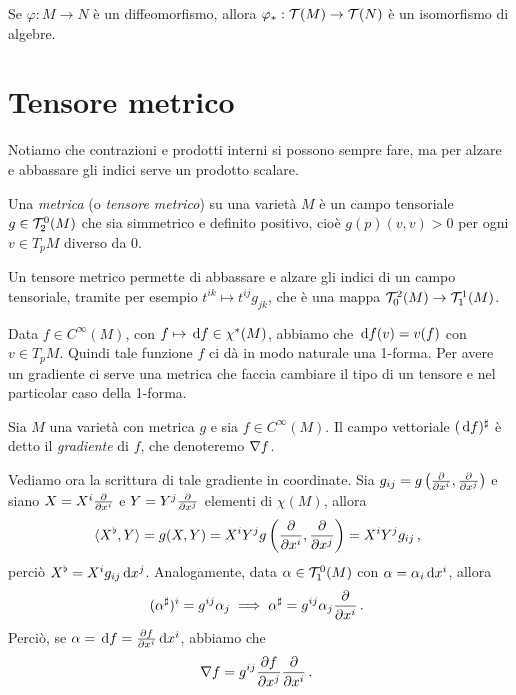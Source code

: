 \begin{remark}
Se $\varphi:M\to N$ è un diffeomorfismo, allora $\varphi_*: \mathcal T(M) \to \mathcal T(N)$ è un isomorfismo di algebre.
\end{remark}

\section{Tensore metrico}

Notiamo che contrazioni e prodotti interni si possono sempre fare, ma per alzare e abbassare gli indici serve un prodotto scalare.

\begin{definition}  
	Una \emph{metrica} (o \emph{tensore metrico}) su una varietà $M$ è un campo tensoriale $g \in \mathcal T_2^0(M)$ che sia simmetrico e definito positivo, cioè $g(p)(v,v)>0$ per ogni $v\in T_pM$ diverso da 0.
\end{definition}

Un tensore metrico permette di abbassare e alzare gli indici di un campo tensoriale, tramite per esempio $t^{ik} \mapsto t^{ij}g_{jk}$, che è una mappa $\mathcal T_0^2(M) \to \mathcal T_1^1(M)$.

Data $f\in C^\infty(M)$, con $f \mapsto \,\mathrm d f \in \chi^*(M)$, abbiamo che $\,\mathrm d f(v) = v(f)$ con $v \in T_pM$. Quindi tale funzione $f$ ci dà in modo naturale una 1-forma.
Per avere un gradiente ci serve una metrica che faccia cambiare il tipo di un tensore e nel particolar caso della 1-forma.

\begin{definition} 
	Sia $M$ una varietà con metrica $g$ e sia $f \in C^\infty(M)$. Il campo vettoriale $(\,\mathrm d f)^\sharp$ è detto il \emph{gradiente} di $f$, che denoteremo $\nabla f$. %
\end{definition}

Vediamo ora la scrittura di tale gradiente in coordinate. Sia $g_{ij} = g\left(\frac{\partial }{\partial x^i}, \frac{\partial }{\partial x^j}\right)$ e siano $X = X^i\frac{\partial }{\partial x^i}$ e $Y = Y^j\frac{\partial }{\partial x^j}$ elementi di $\chi(M)$, allora
\begin{equation*}
	\langle X^\flat , Y \rangle = g(X,Y) = X^iY^j g\left(\frac{\partial }{\partial x^i}, \frac{\partial }{\partial x^j}\right) = X^iY^j g_{ij} \, \text{, }
\end{equation*}
perciò $X^\flat = X^i g_{ij} \,\mathrm d x^j$.
Analogamente, data $\alpha \in \mathcal T_1^0(M)$ con $\alpha = \alpha_i\,\mathrm d x^i$, allora
\begin{equation*}
	(\alpha^\sharp)^i = g^{ij} \alpha_j \implies \alpha^\sharp = g^{ij} \alpha_j\frac{\partial }{\partial x^i} \, \text{. }
\end{equation*}
Perciò, se $\alpha = \,\mathrm d f = \frac{\partial f}{\partial x^i}\,\mathrm d x^i$, abbiamo che
\begin{equation*}
	\nabla f = g^{ij} \frac{\partial f}{\partial x^j} \frac{\partial }{\partial x^i} \, \text{. }
\end{equation*}




